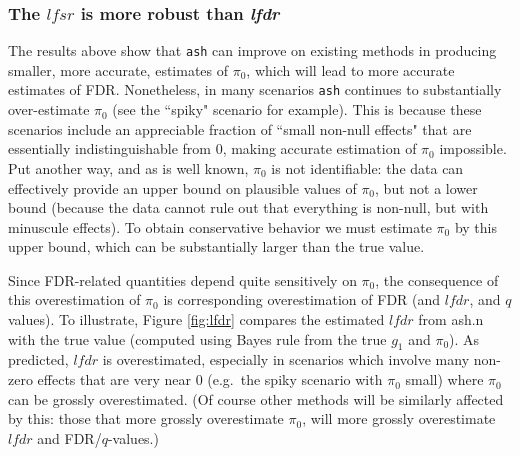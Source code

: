 \documentclass[11pt]{article}
\def\lfdr{\textit{lfdr}}
\def\lfsr{\textit{lfsr}}
\def\ash{{\tt ash}\xspace}
\begin{document}
%
%


\subsubsection*{The $\lfsr$ is more robust than \lfdr}

The results above show that \ash can improve on existing methods in producing smaller, more accurate, 
estimates of $\pi_0$, which will lead to more accurate estimates of FDR.
Nonetheless, in many scenarios \ash continues
to substantially over-estimate $\pi_0$ (see the ``spiky" scenario for example). 
This is because these scenarios include 
an appreciable fraction of ``small non-null effects" that are essentially indistinguishable from 0, making accurate
estimation of $\pi_0$ impossible. Put another way, and as is well known, $\pi_0$ is not identifiable:
 the data can effectively provide an upper bound on plausible values of $\pi_0$,
but not a lower bound (because the data cannot rule out that everything is non-null, but with minuscule effects).
To obtain conservative behavior we must estimate $\pi_0$ by this upper bound, which can
be substantially larger than the true value. 

Since FDR-related quantities depend quite sensitively on $\pi_0$, the consequence of this 
overestimation of $\pi_0$ is corresponding overestimation of FDR (and $\lfdr$, and $q$ values).
To illustrate, Figure \ref{fig:lfdr} compares the estimated $\lfdr$ from ash.n with the true value (computed using
Bayes rule from the true $g_1$ and $\pi_0$). As predicted, $\lfdr$ is overestimated, especially in scenarios which involve many
non-zero effects that are very near 0 (e.g.~the spiky scenario with $\pi_0$ small) where
$\pi_0$ can be grossly overestimated.  
(Of course other methods will be similarly affected by this: those that more grossly overestimate $\pi_0$, will more grossly overestimate $\lfdr$ and FDR/$q$-values.)
\end{document}
